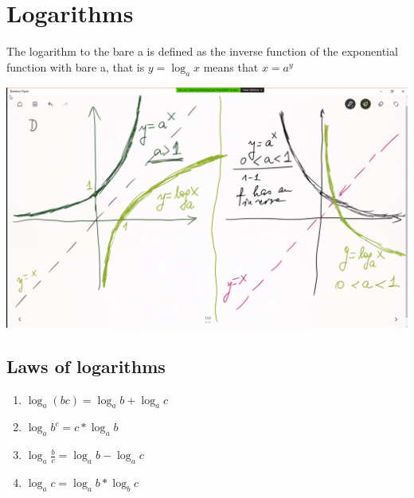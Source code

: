 \documentclass{article}
\begin{document}
	\section{Logarithms}
	The logarithm to the bare a is defined as the inverse function of the exponential function with bare a, that is $y=\log_ax$ means that $x=a^y$
	
	\includegraphics[scale=0.17]{1.png}
	
	\subsection{Laws of logarithms}
	\begin{enumerate}
		\item $\log_a(bc) = \log_ab + \log_ac$
		\item $\log_ab^c = c*\log_ab$
		\item $\log_a\frac{b}{c} = \log_ab - \log_ac$
		\item $\log_ac = \log_ab * \log_bc$
	\end{enumerate}
	\pagebreak
\end{document}
